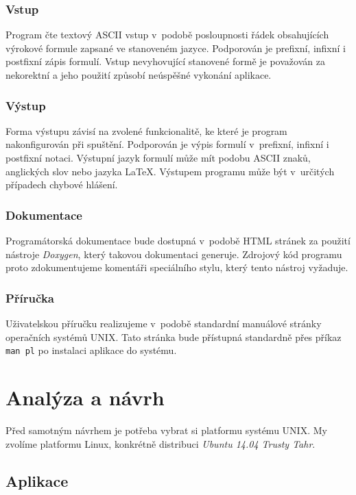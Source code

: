 \documentclass[thesis=B,czech,hidelinks]{FITthesis}[2012/06/26]
\begin{document}
\subsection{Vstup}

Program čte textový ASCII vstup v~podobě posloupnosti řádek obsahujících výrokové formule zapsané ve stanoveném jazyce. Podporován je prefixní, infixní i postfixní zápis formulí. Vstup nevyhovující stanovené formě je považován za nekorektní a jeho použití způsobí neúspěšné vykonání aplikace.

\subsection{Výstup}

Forma výstupu závisí na zvolené funkcionalitě, ke které je program nakonfigurován při spuštění. Podporován je výpis formulí v~prefixní, infixní i postfixní notaci. Výstupní jazyk formulí může mít podobu ASCII znaků, anglických slov nebo jazyka LaTeX. Výstupem programu může být v~určitých případech chybové hlášení.

\subsection{Dokumentace}

Programátorská dokumentace bude dostupná v~podobě HTML stránek za použití nástroje \emph{Doxygen}, který takovou dokumentaci generuje. Zdrojový kód programu proto zdokumentujeme komentáři speciálního stylu, který tento nástroj vyžaduje.

\subsection{Příručka}

Uživatelskou příručku realizujeme v~podobě standardní manuálové stránky operačních systémů UNIX. Tato stránka bude přístupná standardně přes příkaz \texttt{man pl} po instalaci aplikace do systému.

%
%
%

\chapter{Analýza a návrh}

Před samotným návrhem je potřeba vybrat si platformu systému UNIX. My zvolíme platformu Linux, konkrétně distribuci \emph{Ubuntu 14.04 Trusty Tahr}.

\section{Aplikace}
\end{document}
